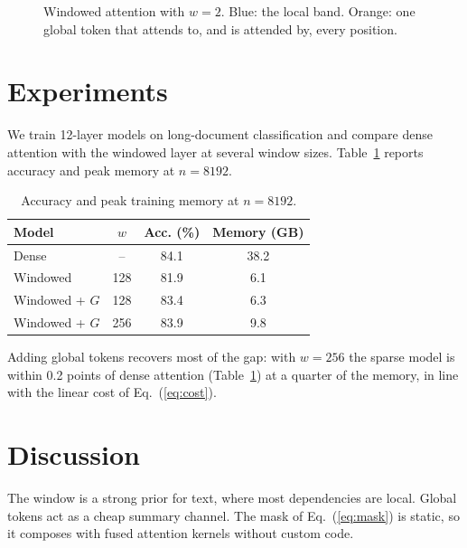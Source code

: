 \documentclass[11pt]{article}
\begin{document}
\begin{figure}[t]
\centering
{}
\caption{Windowed attention with $w=2$. Blue: the local band. Orange: one global token
that attends to, and is attended by, every position.}
\label{fig:pattern}
\end{figure}

\section{Experiments}
We train 12-layer models on long-document classification and compare dense attention
with the windowed layer at several window sizes. Table~\ref{tab:results} reports accuracy
and peak memory at $n = 8192$.

\begin{table}[t]
\centering
\begin{tabular}{lccc}
\toprule
Model & $w$ & Acc. (\%) & Memory (GB) \\
\midrule
Dense            & --  & 84.1 & 38.2 \\
Windowed         & 128 & 81.9 & 6.1 \\
Windowed + $G$   & 128 & 83.4 & 6.3 \\
Windowed + $G$   & 256 & 83.9 & 9.8 \\
\bottomrule
\end{tabular}
\caption{Accuracy and peak training memory at $n=8192$.}
\label{tab:results}
\end{table}

Adding global tokens recovers most of the gap: with $w=256$ the sparse model is within
0.2 points of dense attention (Table~\ref{tab:results}) at a quarter of the memory, in
line with the linear cost of Eq.~(\ref{eq:cost}).

\section{Discussion}
The window is a strong prior for text, where most dependencies are local. Global tokens
act as a cheap summary channel. The mask of Eq.~(\ref{eq:mask}) is static, so it composes
with fused attention kernels without custom code.
\end{document}
